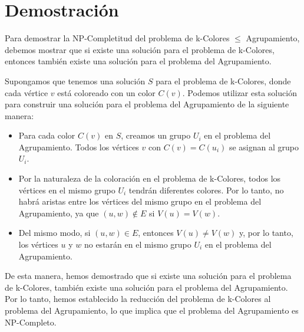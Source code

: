 \newpage

\section{Demostración}
Para demostrar la NP-Completitud del problema de k-Colores $\leq$ Agrupamiento, debemos mostrar que si existe una solución para el problema de k-Colores, entonces también existe una solución para el problema del Agrupamiento.

Supongamos que tenemos una solución $S$ para el problema de k-Colores, donde cada vértice $v$ está coloreado con un color $C(v)$. Podemos utilizar esta solución para construir una solución para el problema del Agrupamiento de la siguiente manera:
\begin{itemize}
\item Para cada color $C(v)$ en $S$, creamos un grupo $U_i$ en el problema del Agrupamiento. Todos los vértices $v$ con $C(v) = C(u_i)$ se asignan al grupo $U_i$.

\item Por la naturaleza de la coloración en el problema de k-Colores, todos los vértices en el mismo grupo $U_i$ tendrán diferentes colores. Por lo tanto, no habrá aristas entre los vértices del mismo grupo en el problema del Agrupamiento, ya que $(u, w) \notin E$ si $V(u) = V(w)$.

\item Del mismo modo, si $(u, w) \in E$, entonces $V(u) \neq V(w)$ y, por lo tanto, los vértices $u$ y $w$ no estarán en el mismo grupo $U_i$ en el problema del Agrupamiento.
\end{itemize}

De esta manera, hemos demostrado que si existe una solución para el problema de k-Colores, también existe una solución para el problema del Agrupamiento. Por lo tanto, hemos establecido la reducción del problema de k-Colores al problema del Agrupamiento, lo que implica que el problema del Agrupamiento es NP-Completo.

\newpage
\nocite{parsimonious}


